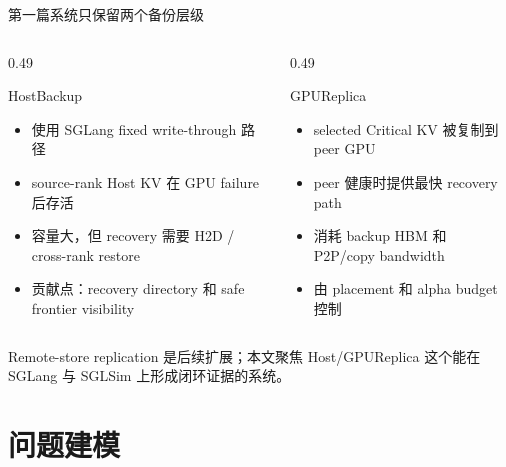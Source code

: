 \documentclass[aspectratio=43]{beamer}
\newcommand{\tightitems}{\setlength{\itemsep}{2pt}\setlength{\parskip}{0pt}}
\newcommand{\Critical}{Critical}
\newcommand{\HostBackup}{HostBackup}
\newcommand{\GPUReplica}{GPUReplica}
\begin{document}
\begin{frame}{第一篇系统只保留两个备份层级}
  \small
  \begin{columns}[T,onlytextwidth]
    \begin{column}{0.49\textwidth}
      \begin{block}{\HostBackup}
        \begin{itemize}
          \tightitems
          \item 使用 SGLang fixed write-through 路径
          \item source-rank Host KV 在 GPU failure 后存活
          \item 容量大，但 recovery 需要 H2D / cross-rank restore
          \item 贡献点：recovery directory 和 safe frontier visibility
        \end{itemize}
      \end{block}
    \end{column}
    \begin{column}{0.49\textwidth}
      \begin{block}{\GPUReplica}
        \begin{itemize}
          \tightitems
          \item selected \Critical{} KV 被复制到 peer GPU
          \item peer 健康时提供最快 recovery path
          \item 消耗 backup HBM 和 P2P/copy bandwidth
          \item 由 placement 和 alpha budget 控制
        \end{itemize}
      \end{block}
    \end{column}
  \end{columns}

  \vspace{0.12cm}
  \footnotesize
  Remote-store replication 是后续扩展；本文聚焦 Host/GPUReplica 这个能在 SGLang 与 SGLSim 上形成闭环证据的系统。
\end{frame}

\section{问题建模}
\end{document}
